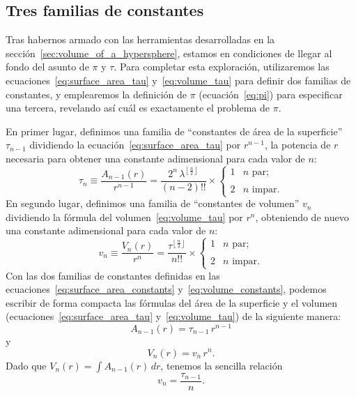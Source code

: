


  \subsection{Tres familias de constantes} %
  \label{sec:three_families_of_constants}

Tras habernos armado con las herramientas desarrolladas en la sección~\ref{sec:volume_of_a_hypersphere}, estamos en condiciones de llegar al fondo del asunto de $\pi$ y $\tau$. Para completar esta exploración, utilizaremos las ecuaciones~\eqref{eq:surface_area_tau} y~\eqref{eq:volume_tau} para definir dos familias de constantes, y emplearemos la definición de $\pi$ (ecuación~\eqref{eq:pi}) para especificar una tercera, revelando así cuál es exactamente el problema de $\pi$.

En primer lugar, definimos una familia de ``constantes de área de la superficie'' $\tau_{n-1}$ dividiendo \linebreak la ecuación~\eqref{eq:surface_area_tau} por $r^{n-1}$, la potencia de $r$ necesaria para obtener una constante adimensional para cada valor de $n$:
\begin{equation}
\label{eq:surface_area_constants}
\tau_n \equiv \frac{A_{n-1}(r)}{r^{n-1}} = \frac{2^n\,\lambda^{\left\lfloor \frac{n}{2} \right\rfloor}}{(n-2)!!}\times 
\begin{cases}
  1 & n \text{ par}; \\ \\
  2 & n \text{ impar}.
\end{cases}
\end{equation}
En segundo lugar, definimos una familia de ``constantes de volumen'' $v_n$ dividiendo la fórmula del volumen~\eqref{eq:volume_tau} por $r^n$, obteniendo de nuevo una constante adimensional para cada valor de $n$:
\begin{equation}
\label{eq:volume_constants}
v_n \equiv \frac{V_n(r)}{r^n} = \frac{\tau^{\left\lfloor \frac{n}{2} \right\rfloor}}{n!!} \times
\begin{cases}
  1 & n \text{ par}; \\ \\
  2 & n \text{ impar}.
\end{cases}
\end{equation}
Con las dos familias de constantes definidas en las ecuaciones~\eqref{eq:surface_area_constants} y~\eqref{eq:volume_constants}, podemos escribir de forma compacta las fórmulas del área de la superficie y el volumen (ecuaciones~\eqref{eq:surface_area_tau} y~\eqref{eq:volume_tau}) de la siguiente manera:
\[ A_{n-1}(r) = \tau_{n-1}\,r^{n-1} \]
y
\[ V_n(r) = v_n\,r^n. \]
Dado que $V_n(r) = \int A_{n-1}(r)\,dr$, tenemos la sencilla relación
\[
v_n = \frac{\tau_{n-1}}{n}.
\]

